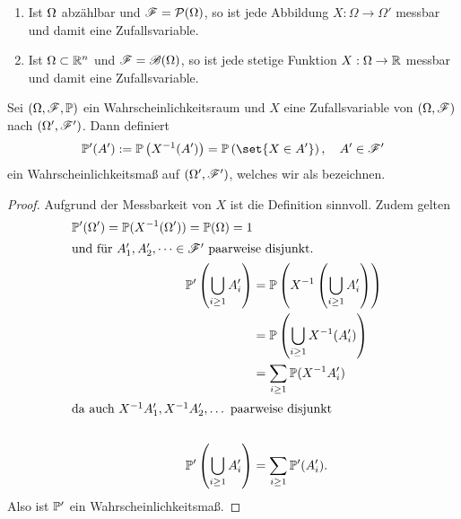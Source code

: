 \begin{example}
	\begin{enumerate}
		\item Ist $\Omega$ abzählbar und $\mathscr F = \mathcal{P}(\Omega)$, so ist jede Abbildung $X: \Omega \to \Omega'$ messbar und damit eine Zufallsvariable.
		\item Ist $\Omega \subset \mathbb{R}^n$ und $\mathscr{F} = \mathscr{B}(\Omega)$, so ist jede stetige Funktion $X: \Omega \to \mathbb{R}$ messbar und damit eine Zufallsvariable.
	\end{enumerate}
\end{example}

\begin{proposition}
	Sei $(\Omega, \mathscr{F}, \mathbb{P})$ ein Wahrscheinlichkeitsraum und $X$ eine Zufallsvariable von $(\Omega, \mathscr{F})$ nach $(\Omega', \mathscr{F}')$. Dann definiert
	\begin{align}
		\probp'(A') := \probp\left(X^{-1}(A')\right) = \probp\left(\set{X \in A'}\right),\quad A' \in \sigF'\notag
	\end{align}
	ein Wahrscheinlichkeitsmaß auf $(\Omega', \mathscr{F}')$, welches wir als  bezeichnen.
\end{proposition}

\begin{proof}
	Aufgrund der Messbarkeit von $X$ ist die Definition sinnvoll. Zudem gelten
	\begin{align*}
		\mathbb{P}'(\Omega') = \mathbb{P}(X^{-1}(\Omega')) = \mathbb{P}(\Omega) = 1\\
		\intertext{und für $A_1', A_2', \dots \in \mathscr{F}'$ paarweise disjunkt.}
		\mathbb{P}'\left( \bigcup_{i \ge 1} A_i'\right) &= \mathbb{P}\left(X^{-1}\left( \bigcup_{i \ge 1} A_i' \right)\right) \\
		&= \mathbb{P}\left( \bigcup_{i \ge 1} X^{-1}(A_i') \right) \\
		&= \sum_{i \ge 1} \mathbb{P}(X^{-1}A_i') \\
		\intertext{da auch $X^{-1}A_1', X^{-1}A_2', \dots$ paarweise disjunkt}\\
		\mathbb{P}'\left( \bigcup_{i \ge 1} A_i'\right) &= \sum_{i \ge 1} \mathbb{P}'(A_i').
	\end{align*}
	Also ist $\mathbb{P}'$ ein Wahrscheinlichkeitsmaß.
\end{proof}

